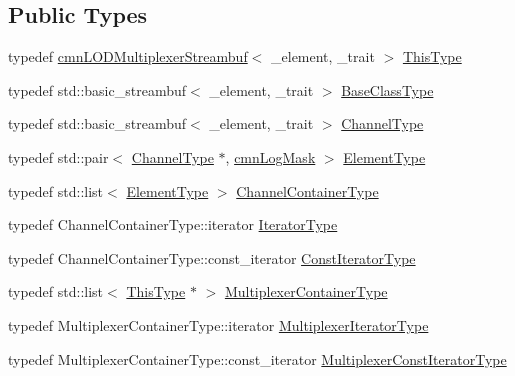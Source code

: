 \subsection*{Public Types}
\begin{DoxyCompactItemize}
\item 
typedef \hyperlink{classcmn_l_o_d_multiplexer_streambuf}{cmn\+L\+O\+D\+Multiplexer\+Streambuf}$<$ \+\_\+element, \+\_\+trait $>$ \hyperlink{classcmn_l_o_d_multiplexer_streambuf_aa50efd43cb53bb6be746e3990e02452a}{This\+Type}
\item 
typedef std\+::basic\+\_\+streambuf$<$ \+\_\+element, \+\_\+trait $>$ \hyperlink{classcmn_l_o_d_multiplexer_streambuf_acd1cdcc6f9f1607317e5ec459b67da37}{Base\+Class\+Type}
\item 
typedef std\+::basic\+\_\+streambuf$<$ \+\_\+element, \+\_\+trait $>$ \hyperlink{classcmn_l_o_d_multiplexer_streambuf_aa3b0347701c1aa5157a719978a1a6386}{Channel\+Type}
\item 
typedef std\+::pair$<$ \hyperlink{classcmn_l_o_d_multiplexer_streambuf_aa3b0347701c1aa5157a719978a1a6386}{Channel\+Type} $\ast$, \hyperlink{cmn_log_lo_d_8h_a44b6ef7560b0d204460b0a54f1a5d702}{cmn\+Log\+Mask} $>$ \hyperlink{classcmn_l_o_d_multiplexer_streambuf_ac397e28a9605093b41ec53ac52eefef5}{Element\+Type}
\item 
typedef std\+::list$<$ \hyperlink{classcmn_l_o_d_multiplexer_streambuf_ac397e28a9605093b41ec53ac52eefef5}{Element\+Type} $>$ \hyperlink{classcmn_l_o_d_multiplexer_streambuf_a2fd9fe59de3be9b8cf5546ac2b0e41bb}{Channel\+Container\+Type}
\item 
typedef Channel\+Container\+Type\+::iterator \hyperlink{classcmn_l_o_d_multiplexer_streambuf_a32236d21fe0e9a13f4bea6ed743b0613}{Iterator\+Type}
\item 
typedef Channel\+Container\+Type\+::const\+\_\+iterator \hyperlink{classcmn_l_o_d_multiplexer_streambuf_ad60c91a0708ddcaf266d48f09d37bb63}{Const\+Iterator\+Type}
\item 
typedef std\+::list$<$ \hyperlink{classcmn_l_o_d_multiplexer_streambuf_aa50efd43cb53bb6be746e3990e02452a}{This\+Type} $\ast$ $>$ \hyperlink{classcmn_l_o_d_multiplexer_streambuf_abddd0ebc7e720ea977f857c6350dd5a0}{Multiplexer\+Container\+Type}
\item 
typedef Multiplexer\+Container\+Type\+::iterator \hyperlink{classcmn_l_o_d_multiplexer_streambuf_addfaa1fedcd4e3b6df8e4020ec2cbde3}{Multiplexer\+Iterator\+Type}
\item 
typedef Multiplexer\+Container\+Type\+::const\+\_\+iterator \hyperlink{classcmn_l_o_d_multiplexer_streambuf_a8c5b7460b364a24c760c4acaa6d6f042}{Multiplexer\+Const\+Iterator\+Type}
\end{DoxyCompactItemize}
